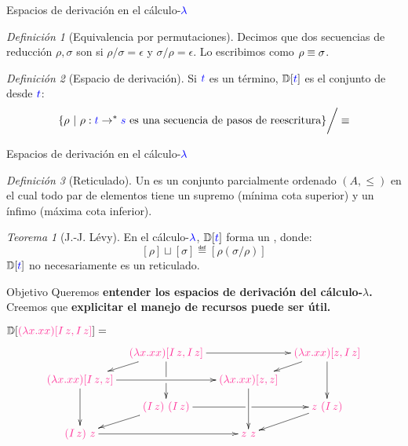 \documentclass{beamer}
\theoremstyle{remark}
\newtheorem{defes}{Definición}
\newtheorem{teoes}{Teorema}
\newcommand{\cLam}[1]{{\color{darkBlue} #1}}
\newcommand{\cProto}[1]{{\color{lightBlue} #1}}
\newcommand{\clambda}{\cLam{\lambda}}
\begin{document}
\begin{frame}{Espacios de derivación en el cálculo-$\clambda$}
\begin{defes}[Equivalencia por permutaciones]
  Decimos que dos secuencias de reducción $\rho, \sigma$ son  si $\rho/\sigma = \epsilon$ y $\sigma/\rho = \epsilon$.
Lo escribimos como $\rho \equiv \sigma$.
\end{defes}

\vskip 0.7cm

\begin{defes}[Espacio de derivación]
Si $\cLam{\tm}$ es un término, $\ulbDeriv{\cLam{\tm}}$ es el conjunto de
 desde $\cLam{\tm}$:
\[
  \set{\rho \ | \ \rho : \cLam{t} \to^* \cLam{s} \text{ es una secuencia de pasos de reescritura}} \bigg/ \permeq
\]
\end{defes}
\end{frame}

\begin{frame}{Espacios de derivación en el cálculo-$\clambda$}

\begin{defes}[Reticulado]
  Un  es un conjunto parcialmente ordenado $(A, \leq)$ en el cual
todo par de elementos tiene un supremo (mínima cota superior)
y un ínfimo (máxima cota inferior).
\end{defes}

\vskip 0.5cm

\begin{teoes}[J.-J. Lévy]
En el cálculo-$\clambda$, $\ulbDeriv{\cLam{t}}$ forma un ,
donde:
\[[\rho] \sqcup [\sigma] \eqdef [\rho (\sigma / \rho)] \]
\noindent $\ulbDeriv{\cLam{t}}$ no necesariamente es un reticulado.
\end{teoes}

\end{frame}


\begin{frame}{Objetivo}
Queremos \textbf{entender los espacios de derivación del cálculo-$\lambda$.}
\vskip 0.2cm
Creemos que \textbf{explicitar el manejo de recursos puede ser útil.}
\vskip 0.5cm

$\ulbDeriv{\cProto{(\lam{x}{x x}) [I\, z, I\, z]}} = $
\[\xymatrix@=0.3cm{
& \cProto{(\lam{x}{x x}) [I\, z, I\, z]} \ar[rr] \ar[dd]|!{[d]}\hole \ar[dl]
& & \cProto{(\lam{x}{x x}) [z, I\, z]} \ar[dd] \ar[dl]
\\
\cProto{(\lam{x}{x x}) [I\, z, z]} \ar[rr]\ar[dd]
& & \cProto{(\lam{x}{x x}) [z, z]} \ar[dd]
\\
& \cProto{(I\, z)\ (I\, z)} \ar[rr]|!{[r]}\hole \ar[dl]
& & \cProto{z\ (I\, z)} \ar[dl]
\\
\cProto{(I\, z)\ z} \ar[rr]
& & \cProto{z\ z}
}\]
\end{frame}
\end{document}
